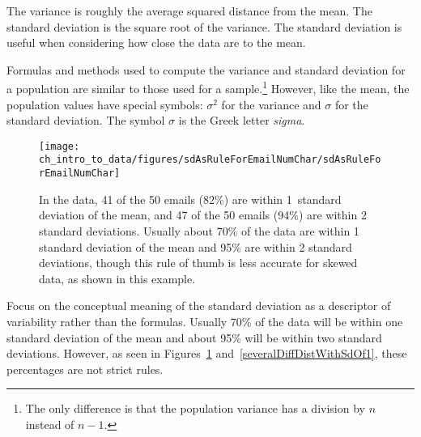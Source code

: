 \begin{termBox}{
The variance is roughly the average squared distance from the mean. The standard deviation is the square root of the variance. The standard deviation is useful when considering how close the data are to the mean.}
\end{termBox}

Formulas and methods used to compute the variance and standard deviation for a population are similar to those used for a sample.\footnote{The only difference is that the population variance has a division by $n$ instead of $n-1$.} However, like the mean, the population values have special symbols: $\sigma_{}^2$ for the variance and $\sigma$ for the standard deviation. The symbol $\sigma$  is the Greek letter \emph{sigma}.


\begin{figure}
\centering
\texttt{[image: ch\_intro\_to\_data/figures/sdAsRuleForEmailNumChar/sdAsRuleForEmailNumChar]}
\caption{In the  data, 41 of the 50 emails (82\%) are within 1~standard deviation of the mean, and 47 of the 50 emails (94\%) are within 2 standard deviations. Usually about 70\% of the data are within 1 standard deviation of the mean and 95\% are within 2 standard deviations, though this rule of thumb is less accurate for skewed data, as shown in this example.}
\label{sdAsRuleForEmailNumChar}
\end{figure}

\begin{tipBox}{
Focus on the conceptual meaning of the standard deviation as a descriptor of variability rather than the formulas. Usually 70\% of the data will be within one standard deviation of the mean and about 95\% will be within two standard deviations. However, as seen in Figures~\ref{sdAsRuleForEmailNumChar} and~\ref{severalDiffDistWithSdOf1}, these percentages are not strict rules.}
\end{tipBox}

